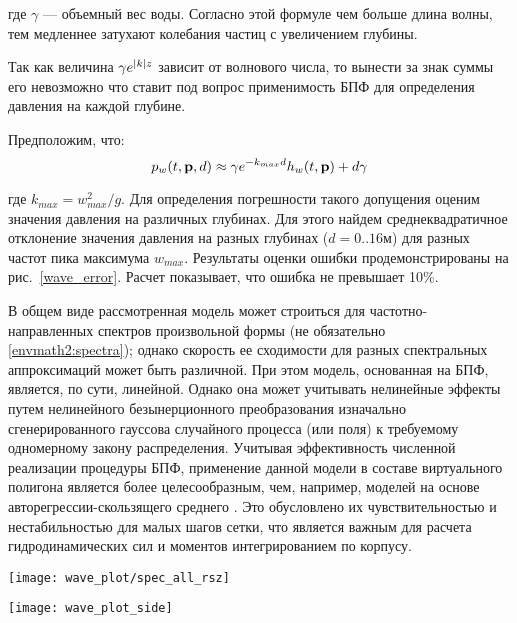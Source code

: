 где $\gamma$ --- объемный вес воды. Согласно этой формуле чем больше длина волны, тем медленнее затухают колебания частиц с увеличением глубины.

Так как величина $\gamma e^{\lvert k\rvert z}$ зависит от волнового числа, то вынести за знак суммы его невозможно что ставит под вопрос применимость БПФ для определения давления на каждой глубине.

Предположим, что:
\begin{equation}
\label{wave_height}
	p_w(t,\mathbf{p},d) \approx
		\gamma e^{-k_{max}d} h_w(t,\mathbf{p}) + d \gamma
\end{equation}

где $k_{max} = w_{max}^{2} / g$. Для определения погрешности такого допущения оценим значения давления на различных глубинах. Для этого найдем среднеквадратичное отклонение значения давления на разных глубинах
 ($d=0..16 \text{м}$) для разных частот пика максимума $w_{max}$. Результаты оценки ошибки продемонстрированы на рис.~\ref{wave_error}. Расчет показывает, что ошибка не превышает 10\%. 

В общем виде рассмотренная модель может строиться для частотно-направленных спектров произвольной формы (не обязательно \eqref{envmath2:spectra}); однако скорость ее сходимости для разных спектральных аппроксимаций может быть различной. При этом модель, основанная на БПФ, является, по сути, линейной. Однако она может учитывать нелинейные эффекты путем нелинейного безынерционного преобразования изначально сгенерированного гауссова случайного процесса (или поля) к требуемому одномерному закону распределения. Учитывая эффективность численной реализации процедуры БПФ, применение данной модели в составе виртуального полигона является более целесообразным, чем, например, моделей на основе авторегрессии-скользящего среднего \citep{dk8}. Это обусловлено их чувствительностью и нестабильностью для малых шагов сетки, что является важным для расчета гидродинамических сил и моментов интегрированием по корпусу. 



\begin{sidewaysfigure}
\begin{center}
	\texttt{[image: wave\_plot/spec\_all\_rsz]}
\end{center}
\caption{Планшеты ядра БПФ и карт высот морского волнения для различных значение параметра формы углового распределения}
\label{waveplot}
\end{sidewaysfigure}

\begin{sidewaysfigure}
	\texttt{[image: wave\_plot\_side]}
	\caption{Оценка ошибки расчета давления приближенным способом: (a) --- профиль поверхностей равного давления при точном расчете; (б) --- профиль поверхностей равного давления при приближенном расчете; (в) --- стандартное отклонение ошибки расчета давления на разных глубинах для различных частот пика максимума; (г) --- относительная ошибка расчета давления на разных глубинах для различных частот пика максимума.}
	\label{wave_error}
\end{sidewaysfigure}

